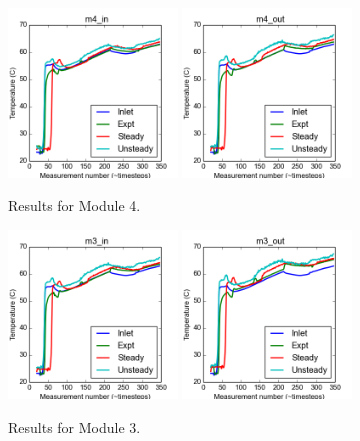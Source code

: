\documentclass{article}
\begin{document}
\clearpage
\begin{figure}[!ht]
\centering
\includegraphics[width=0.4\textwidth]{../../data/ICSolar/images/Feb6_m4_in_compare.png}\hspace{0.05\textwidth}
\includegraphics[width=0.4\textwidth]{../../data/ICSolar/images/Feb6_m4_out_compare.png}\hspace{0.05\textwidth}\\
\caption{Results for Module 4.}\end{figure}
\begin{figure}[!ht]
\centering
\includegraphics[width=0.4\textwidth]{../../data/ICSolar/images/Feb6_m3_in_compare.png}\hspace{0.05\textwidth}
\includegraphics[width=0.4\textwidth]{../../data/ICSolar/images/Feb6_m3_out_compare.png}\hspace{0.05\textwidth}\\
\caption{Results for Module 3.}\end{figure}
\end{document}
